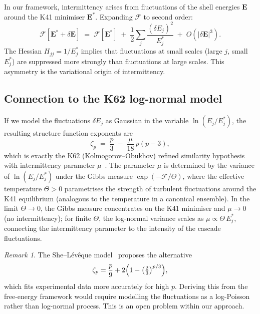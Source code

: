 \documentclass[12pt,a4paper]{article}
\theoremstyle{definition}
\theoremstyle{plain}
\theoremstyle{remark}
\newtheorem{remark}[definition]{Remark}
\begin{document}
In our framework, intermittency arises from fluctuations of the shell
energies $\mathbf{E}$ around the K41 minimiser $\mathbf{E}^*$.  Expanding
$\mathcal{F}$ to second order:
\begin{equation}\label{eq:F_expand}
  \mathcal{F}[\mathbf{E}^* + \delta\mathbf{E}]
  \;=\;
  \mathcal{F}[\mathbf{E}^*]
  \;+\;
  \frac{1}{2}\sum_{j}
    \frac{(\delta E_j)^2}{E_j^*}
  \;+\; O(|\delta\mathbf{E}|^3).
\end{equation}
The Hessian $H_{jj} = 1/E_j^*$ implies that fluctuations at small scales
(large $j$, small $E_j^*$) are suppressed more strongly than fluctuations
at large scales.  This asymmetry is the variational origin of
intermittency.

\subsection{Connection to the K62 log-normal model}

If we model the fluctuations $\delta E_j$ as Gaussian in the variable
$\ln(E_j/E_j^*)$, the resulting structure function exponents are
\begin{equation}\label{eq:zeta_p}
  \zeta_p
  \;=\;
  \frac{p}{3}
  \;-\;
  \frac{\mu}{18}\,p(p-3),
\end{equation}
which is exactly the K62 (Kolmogorov--Obukhov) refined similarity
hypothesis with intermittency parameter $\mu$~\cite{K62,Frisch95}.  The
parameter $\mu$ is determined by the variance of $\ln(E_j/E_j^*)$ under
the Gibbs measure $\exp(-\mathcal{F}/\Theta)$, where the effective
temperature $\Theta > 0$ parametrises the strength of turbulent
fluctuations around the K41 equilibrium (analogous to the temperature
in a canonical ensemble).  In the limit $\Theta \to 0$, the Gibbs
measure concentrates on the K41 minimiser and $\mu \to 0$ (no
intermittency); for finite $\Theta$, the log-normal variance scales as
$\mu \propto \Theta\,E_j^*$, connecting the intermittency parameter
to the intensity of the cascade fluctuations.

\begin{remark}
The She--L\'ev\^eque model~\cite{SL94} proposes the alternative
\[
  \zeta_p = \frac{p}{9} + 2\Bigl(1 - \bigl(\tfrac{2}{3}\bigr)^{p/3}\Bigr),
\]
which fits experimental data more accurately for high $p$.  Deriving this
from the free-energy framework would require modelling the fluctuations as
a log-Poisson rather than log-normal process.  This is an open problem
within our approach.
\end{remark}
\end{document}
